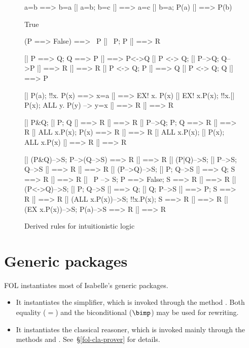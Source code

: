\begin{figure} 
\begin{ttbox}
       a=b ==> b=a
     [| a=b;  b=c |] ==> a=c
    [| b=a;  P(a) |] ==> P(b)

     True

      (P ==> False) ==> ~P
      [| ~P;  P |] ==> R

      [| P ==> Q;  Q ==> P |] ==> P<->Q
      [| P <-> Q;  [| P-->Q; Q-->P |] ==> R |] ==> R
     [| P <-> Q;  P |] ==> Q            
     [| P <-> Q;  Q |] ==> P

      [| P(a);  !!x. P(x) ==> x=a |]  ==>  EX! x. P(x)
      [| EX! x.P(x);  !!x.[| P(x);  ALL y. P(y) --> y=x |] ==> R 
          |] ==> R

     [| P&Q;  [| P; Q |] ==> R |] ==> R
      [| P-->Q;  P;  Q ==> R |] ==> R
      [| ALL x.P(x);  P(x) ==> R |] ==> R
  [| ALL x.P(x);  [| P(x); ALL x.P(x) |] ==> R |] ==> R

 [| (P&Q)-->S;  P-->(Q-->S) ==> R |] ==> R
 [| (P|Q)-->S;  [| P-->S; Q-->S |] ==> R |] ==> R
  [| (P-->Q)-->S;  [| P; Q-->S |] ==> Q;  S ==> R |] ==> R
  [| ~P --> S;  P ==> False;  S ==> R |] ==> R
  [| (P<->Q)-->S; [| P; Q-->S |] ==> Q; [| Q; P-->S |] ==> P;
             S ==> R |] ==> R
  [| (ALL x.P(x))-->S;  !!x.P(x);  S ==> R |] ==> R
   [| (EX x.P(x))-->S;  P(a)-->S ==> R |] ==> R
\end{ttbox}
\caption{Derived rules for intuitionistic logic} \label{fol-int-derived}
\end{figure}


\section{Generic packages}
FOL instantiates most of Isabelle's generic packages.
\begin{itemize}
\item 
It instantiates the simplifier, which is invoked through the method 
.  Both equality ($=$) and the biconditional
($\bimp$) may be used for rewriting.  

\item 
It instantiates the classical reasoner, which is invoked mainly through the 
methods  and .  See~\S\ref{fol-cla-prover}
for details. 
%
\end{itemize}

